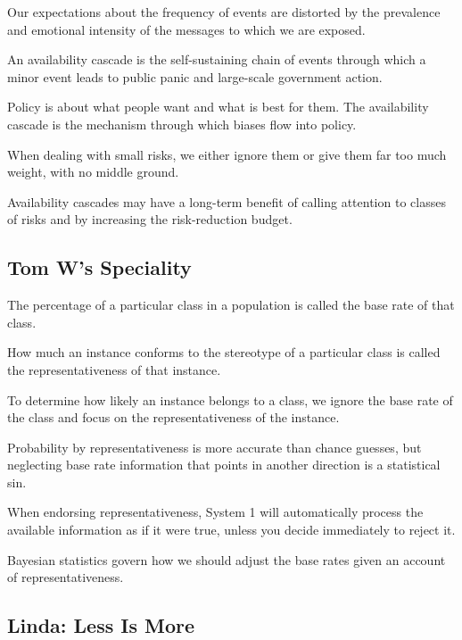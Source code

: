 \bit
\item Our expectations about the frequency of events are distorted by the prevalence and emotional intensity of the
messages to which we are exposed.
\item An availability cascade is the self-sustaining chain of events through which a minor event leads to public
panic and large-scale government action.
\item Policy is about what people want and what is best for them. The availability cascade is the mechanism through
which biases flow into policy.
\item When dealing with small risks, we either ignore them or give them far too much weight, with no middle ground.
\item Availability cascades may have a long-term benefit of calling attention to classes of risks and by increasing
the risk-reduction budget. \eit

\subsection*{Tom W's Speciality}

\bit
\item The percentage of a particular class in a population is called the base rate of that class.
\item How much an instance conforms to the stereotype of a particular class is called the representativeness of that
instance.
\item To determine how likely an instance belongs to a class, we ignore the base rate of the class and focus on the
representativeness of the instance.
\item Probability by representativeness is more accurate than chance guesses, but neglecting base rate information
that points in another direction is a statistical sin.
\item When endorsing representativeness, System 1 will automatically process the available information as if it were
true, unless you decide immediately to reject it.
\item Bayesian statistics govern how we should adjust the base rates given an account of representativeness.
\eit

\subsection*{Linda: Less Is More}

